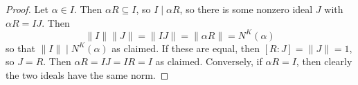 \begin{proof}
	Let $\alpha \in I$. Then $\alpha R \subseteq I$, so $I \mid \alpha R$, so there is some nonzero ideal $J$ with $\alpha R = IJ$. Then
	\[ \|I\| \|J\| = \|IJ\| = \|\alpha R\| = N^K(\alpha) \]
	so that $\|I\| \mid N^K(\alpha)$ as claimed. If these are equal, then $[R:J] = \|J\| = 1$, so $J = R$. Then $\alpha R = IJ = IR = I$ as claimed. Conversely, if $\alpha R = I$, then clearly the two ideals have the same norm.
\end{proof}
